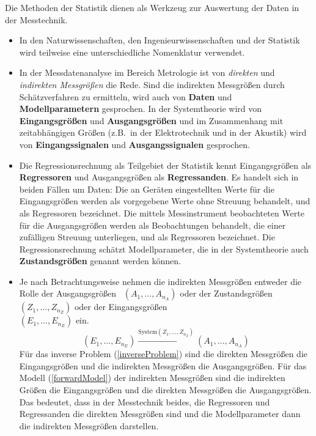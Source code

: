 Die Methoden der Statistik dienen als Werkzeug zur Auswertung der Daten in der Messtechnik.
\begin{itemize}
	\item In den Naturwissenschaften, den Ingenieurwissenschaften und der Statistik wird
  teilweise eine unterschiedliche Nomenklatur verwendet.
	\item In der Messdatenanalyse im Bereich Metrologie ist von \textsl{direkten} 
		und \textsl{indirekten Messgrößen} die Rede. Sind die indirekten Messgrößen durch
		Schätzverfahren zu ermitteln, wird auch von \textbf{Daten} und \textbf{Modellparametern}
		gesprochen.
		In der Systemtheorie wird von \textbf{Eingangsgrößen} und \textbf{Ausgangsgrößen}
		und im Zusammenhang mit zeitabhängigen Größen (z.B.\ in der Elektrotechnik und
		in der Akustik) wird von
		\textbf{Eingangssignalen} und \textbf{Ausgangssignalen} gesprochen. 
	\item Die Regressionsrechnung als Teilgebiet der Statistik kennt Eingangsgrößen als
		\textbf{Regressoren} und Ausgangsgrößen als \textbf{Regressanden}.
			Es handelt sich in beiden Fällen um Daten: Die an Geräten eingestellten Werte für die
			Eingangsgrößen werden als vorgegebene Werte ohne Streuung behandelt, und als
			Regressoren bezeichnet. Die mittels Messinstrument beobachteten Werte für die Ausgangsgrößen
			werden als Beobachtungen behandelt, die einer zufälligen Streuung unterliegen, und
			als Regressoren bezeichnet. Die Regressionsrechnung schätzt Modellparameter, die in der
			Systemtheorie auch \textbf{Zustandsgrößen} genannt werden können.
	\item Je nach Betrachtungsweise nehmen die indirekten Messgrößen entweder
		die Rolle der \glqq Ausgangsgrößen\grqq ~ $(A_1, \dots, A_{n_A})$ oder 
			der \glqq Zustandsgrößen\grqq ~ $(Z_1, \dots, Z_{n_Z})$
			oder der \glqq Eingangsgrößen\grqq \\ $(E_1, \dots, E_{n_E})$ ein.
\begin{equation}
(E_1, \dots, E_{n_E}) \xrightarrow{\mathrm{System} (Z_1, \dots, Z_{n_Z})} (A_1, \dots, A_{n_A})
\label{allgemeinSystem}
\end{equation}
			Für das inverse Problem (\ref{inverseProblem}) sind die direkten Messgrößen die Eingangsgrößen 
			und die indirekten Messgrößen die Ausgangsgrößen. Für das Modell (\ref{forwardModel})
			der indirekten Messgrößen sind die indirekten Größen die Eingangsgrößen und die
			direkten Messgrößen die Ausgangsgrößen. Das bedeutet, dass in
			der Messtechnik beides, die Regressoren und Regressanden die direkten 
			Messgrößen sind und die Modellparameter dann die indirekten Messgrößen darstellen.
\end{itemize}
